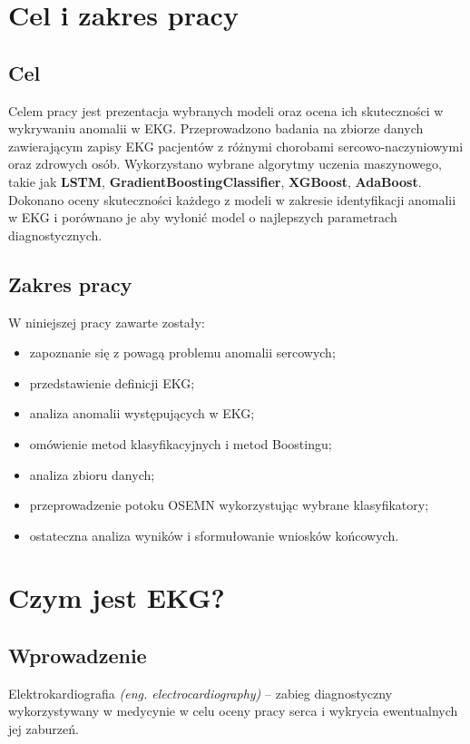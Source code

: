 \documentclass[12pt,a4paper]{article}
\begin{document}
\section{Cel i zakres pracy}

\subsection{Cel}
Celem pracy jest prezentacja wybranych modeli oraz ocena ich skuteczności w wykrywaniu anomalii w EKG. Przeprowadzono badania na zbiorze danych zawierającym zapisy EKG pacjentów z różnymi chorobami sercowo-naczyniowymi oraz zdrowych osób. Wykorzystano wybrane algorytmy uczenia maszynowego, takie jak \textbf{LSTM}, \textbf{GradientBoostingClassifier}, \textbf{XGBoost}, \textbf{AdaBoost}. Dokonano oceny skuteczności każdego z modeli w zakresie identyfikacji anomalii w EKG i porównano je aby wyłonić model o najlepszych parametrach diagnostycznych. 

\subsection{Zakres pracy}
W niniejszej pracy zawarte zostały:
\begin{itemize}
    \item zapoznanie się z powagą problemu anomalii sercowych;
    \item przedstawienie definicji EKG;
    \item analiza anomalii występujących w EKG;
    \item omówienie metod klasyfikacyjnych i metod Boostingu;
    \item analiza zbioru danych;
    \item przeprowadzenie potoku OSEMN wykorzystując wybrane klasyfikatory; 
    \item ostateczna analiza wyników i sformułowanie wniosków końcowych. 
\end{itemize}




\section{Czym jest EKG?}

\subsection{Wprowadzenie}
Elektrokardiografia \textit{(eng. electrocardiography)} \cite{elektrokardiografia-wikipedia}  – zabieg diagnostyczny wykorzystywany w medycynie w celu oceny pracy serca i wykrycia ewentualnych jej zaburzeń.
\end{document}
